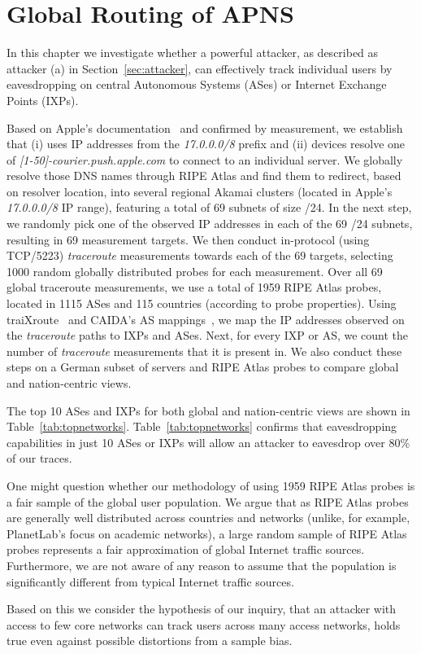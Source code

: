 \section{Global Routing of APNS}\label{sec:routing}
In this chapter we investigate whether a powerful attacker, as described as attacker (a) in Section~\ref{sec:attacker}, can effectively track individual users by eavesdropping on central Autonomous Systems (ASes) or Internet Exchange Points (IXPs).

Based on Apple's documentation~\cite{2016appleapnstrouble} and confirmed by measurement, we establish that (i) {\apns} uses IP addresses from the \textit{17.0.0.0/8} prefix and (ii) devices resolve one of \textit{[1-50]-courier.push.apple.com} to connect to an individual {\apns} server.
We globally resolve those DNS names through RIPE Atlas and find them to redirect, based on resolver location, into several regional Akamai clusters (located in Apple's \textit{17.0.0.0/8} IP range), featuring a total of 69 subnets of size /24.
In the next step, we randomly pick one of the observed IP addresses in each of the 69 /24 subnets, resulting in 69 measurement targets.
We then conduct in-protocol (using TCP/5223) \textit{traceroute} measurements towards each of the 69 targets, selecting 1000 random globally distributed probes for each measurement.
Over all 69 global traceroute measurements, we use a total of 1959 RIPE Atlas probes, located in 1115 ASes  and 115 countries (according to probe properties).
Using traiXroute~\cite{nomikos2016traixroute} and CAIDA's AS mappings~\cite{caidapfx2as}, we map the IP addresses observed on the \textit{traceroute} paths to IXPs and ASes.
Next, for every IXP or AS, we count the number of \textit{traceroute} measurements that it is present in.
We also conduct these steps on a German subset of {\apns} servers and RIPE Atlas probes to compare global and nation-centric views.


The top 10 ASes and IXPs for both global and nation-centric views are shown in Table~\ref{tab:topnetworks}.
Table~\ref{tab:topnetworks} confirms that eavesdropping capabilities in just 10 ASes or IXPs will allow an attacker to eavesdrop over 80\% of our traces.

One might question whether our methodology of using 1959 RIPE Atlas probes is a fair sample of the global {\apns} user population.
We argue that as RIPE Atlas probes are generally well distributed across countries and networks (unlike, for example, PlanetLab's focus on academic networks), a large random sample of RIPE Atlas probes represents a fair approximation of global Internet traffic sources.
Furthermore, we are not aware of any reason to assume that the {\apns} population is significantly different from typical Internet traffic sources.

Based on this we consider the hypothesis of our inquiry, that an attacker with access to few core networks can track users across many access networks, holds true even against possible distortions from a sample bias.
